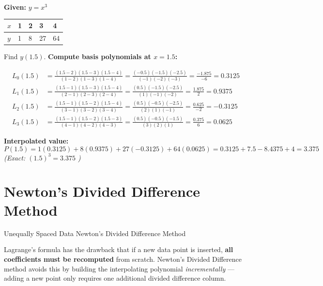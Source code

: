 \documentclass[12pt]{article}
\newcommand{\hcell}[1]{\textbf{\color{white}#1}}
\begin{document}
\begin{examplebox*}
\textbf{Given:} $y = x^3$
\begin{center}
\begin{tabular}{C{1.4cm} C{1.4cm} C{1.4cm} C{1.4cm} C{1.4cm}}
\toprule
{}
\hcell{$x$} & \hcell{1} & \hcell{2} & \hcell{3} & \hcell{4} \\
\midrule
$y$ & 1 & 8 & 27 & 64 \\
\bottomrule
\end{tabular}
\end{center}

Find $y(1.5)$. \textbf{Compute basis polynomials at $x = 1.5$:}

\begin{align*}
  L_0(1.5) &= \frac{(1.5-2)(1.5-3)(1.5-4)}{(1-2)(1-3)(1-4)}
  = \frac{(-0.5)(-1.5)(-2.5)}{(-1)(-2)(-3)} = \frac{-1.875}{-6} = 0.3125\\[6pt]
  L_1(1.5) &= \frac{(1.5-1)(1.5-3)(1.5-4)}{(2-1)(2-3)(2-4)}
  = \frac{(0.5)(-1.5)(-2.5)}{(1)(-1)(-2)} = \frac{1.875}{2} = 0.9375\\[6pt]
  L_2(1.5) &= \frac{(1.5-1)(1.5-2)(1.5-4)}{(3-1)(3-2)(3-4)}
  = \frac{(0.5)(-0.5)(-2.5)}{(2)(1)(-1)} = \frac{0.625}{-2} = -0.3125\\[6pt]
  L_3(1.5) &= \frac{(1.5-1)(1.5-2)(1.5-3)}{(4-1)(4-2)(4-3)}
  = \frac{(0.5)(-0.5)(-1.5)}{(3)(2)(1)} = \frac{0.375}{6} = 0.0625
\end{align*}

\textbf{Interpolated value:}
\[
  P(1.5) = 1(0.3125) + 8(0.9375) + 27(-0.3125) + 64(0.0625)
  = 0.3125 + 7.5 - 8.4375 + 4 = \boxed{3.375}
\]
\textit{(Exact: $(1.5)^3 = 3.375$ \checkmark)}
\end{examplebox*}

\newpage
\section{Newton's Divided Difference Method}

\begin{methodtitle}{Unequally Spaced Data}{}
  Newton's Divided Difference Method
\end{methodtitle}

\begin{histbox}
Lagrange's formula has the drawback that if a new data point is inserted, \textbf{all coefficients must be recomputed} from scratch. Newton's Divided Difference method avoids this by building the interpolating polynomial \textit{incrementally} — adding a new point only requires one additional divided difference column.
\end{histbox}
\end{document}
